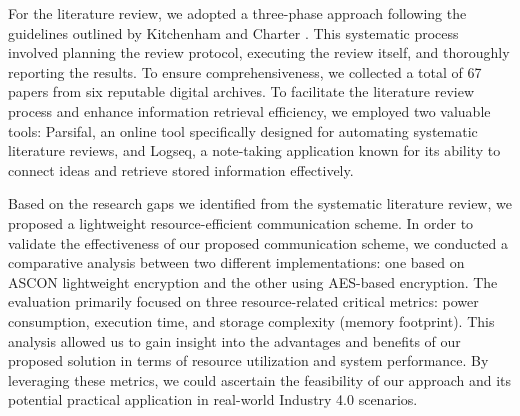 For the literature review, we adopted a three-phase approach following the guidelines outlined by Kitchenham and Charter \cite{kitchenham_guidelines_2007}. This systematic process involved planning the review protocol, executing the review itself, and thoroughly reporting the results. To ensure comprehensiveness, we collected a total of 67 papers from six reputable digital archives. To facilitate the literature review process and enhance information retrieval efficiency, we employed two valuable tools: Parsifal, an online tool specifically designed for automating systematic literature reviews, and Logseq, a note-taking application known for its ability to connect ideas and retrieve stored information effectively.

Based on the research gaps we identified from the systematic literature review, we proposed a lightweight resource-efficient communication scheme. In order to validate the effectiveness of our proposed communication scheme, we conducted a comparative analysis between two different implementations: one based on ASCON lightweight encryption and the other using AES-based encryption. The evaluation primarily focused on three resource-related critical metrics: power consumption, execution time, and storage complexity (memory footprint). This analysis allowed us to gain insight into the advantages and benefits of our proposed solution in terms of resource utilization and system performance. By leveraging these metrics, we could ascertain the feasibility of our approach and its potential practical application in real-world Industry 4.0 scenarios.



